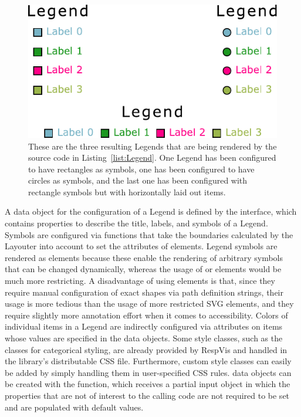 \begin{figure}[tp]
\centering
\includegraphics[keepaspectratio,width=\linewidth / 2,height=\fullh]
{diagrams/legend.pdf}
\caption[Legend Example]{%
These are the three resulting Legends that are being rendered by the
source code in Listing~\ref{list:Legend}.  One Legend has been
configured to have rectangles as symbols, one has been configured to
have circles as symbols, and the last one has been configured with
rectangle symbols but with horizontally laid out items.
}
\label{fig:Legend}
\end{figure}



A data object for the configuration of a Legend is defined by the
 interface, which contains properties to describe the
title, labels, and symbols of a Legend.  Symbols are configured via
functions that take the boundaries calculated by the Layouter into
account to set the  attributes of  elements.
Legend symbols are rendered as  elements because these
enable the rendering of arbitrary symbols that can be changed
dynamically, whereas the usage of  or 
elements would be much more restricting.  A disadvantage of using
 elements is that, since they require manual
configuration of exact shapes via path definition strings, their usage
is more tedious than the usage of more restricted SVG elements, and
they require slightly more annotation effort when it comes to
accessibility.  Colors of individual items in a Legend are indirectly
configured via  attributes on items whose values are
specified in the  data objects.  Some style classes, such
as the  classes for categorical styling, are
already provided by RespVis and handled in the library's distributable
CSS file.  Furthermore, custom style classes can easily be added by
simply handling them in user-specified CSS rules.   data
objects can be created with the  function, which
receives a partial input object in which the properties that are not
of interest to the calling code are not required to be set and are
populated with default values.


